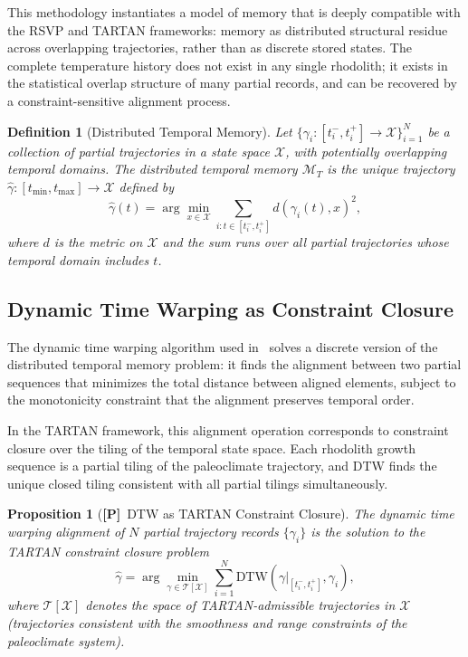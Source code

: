 \documentclass[11pt, oneside]{article}
\numberwithin{equation}{section}
\newcommand{\ClaimP}{\textcolor{rsvpgray!70}{\textbf{[P]}}}
\theoremstyle{rsvpstyle}
\newtheorem{proposition}[theorem]{Proposition}
\newtheorem{definition}[theorem]{Definition}
\theoremstyle{remark}
\begin{document}
This methodology instantiates a model of memory that is deeply compatible with the
RSVP and TARTAN frameworks: memory as distributed structural residue across overlapping
trajectories, rather than as discrete stored states. The complete temperature history
does not exist in any single rhodolith; it exists in the statistical overlap structure
of many partial records, and can be recovered by a constraint-sensitive alignment process.

\begin{definition}[Distributed Temporal Memory]
Let $\{\gamma_i : [t_i^-, t_i^+] \to \mathcal{X}\}_{i=1}^N$ be a collection of
partial trajectories in a state space $\mathcal{X}$, with potentially overlapping
temporal domains. The distributed temporal memory $\mathcal{M}_T$ is the unique
trajectory $\hat\gamma : [t_\text{min}, t_\text{max}] \to \mathcal{X}$ defined by
\begin{equation}
  \hat\gamma(t) = \arg\min_{x \in \mathcal{X}} \sum_{i : t \in [t_i^-, t_i^+]}
  d(\gamma_i(t), x)^2,
\end{equation}
where $d$ is the metric on $\mathcal{X}$ and the sum runs over all partial trajectories
whose temporal domain includes $t$.
\end{definition}

\subsection{Dynamic Time Warping as Constraint Closure}

The dynamic time warping algorithm used in~\cite{Li2026Rhodoliths} solves a discrete
version of the distributed temporal memory problem: it finds the alignment between two
partial sequences that minimizes the total distance between aligned elements, subject
to the monotonicity constraint that the alignment preserves temporal order.

In the TARTAN framework, this alignment operation corresponds to constraint closure
over the tiling of the temporal state space. Each rhodolith growth sequence is a partial
tiling of the paleoclimate trajectory, and DTW finds the unique closed tiling consistent
with all partial tilings simultaneously.

\begin{proposition}[\ClaimP\ DTW as TARTAN Constraint Closure]
The dynamic time warping alignment of $N$ partial trajectory records $\{\gamma_i\}$
is the solution to the TARTAN constraint closure problem
\begin{equation}
  \hat\gamma = \arg\min_{\gamma \in \mathcal{T}[\mathcal{X}]}
  \sum_{i=1}^N \text{DTW}(\gamma|_{[t_i^-, t_i^+]}, \gamma_i),
\end{equation}
where $\mathcal{T}[\mathcal{X}]$ denotes the space of TARTAN-admissible trajectories
in $\mathcal{X}$ (trajectories consistent with the smoothness and range constraints
of the paleoclimate system).
\end{proposition}
\end{document}
